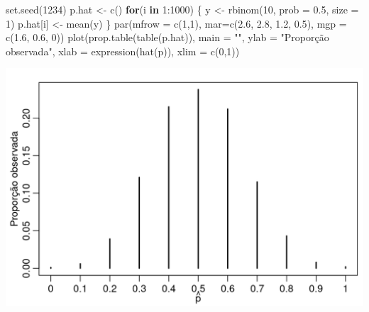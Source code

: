 \documentclass[
  10pt,
  a4paper]{book}
\newenvironment{Shaded}{\begin{snugshade}}{\end{snugshade}}
\newcommand{\AttributeTok}[1]{\textcolor[rgb]{0.77,0.63,0.00}{#1}}
\newcommand{\ControlFlowTok}[1]{\textcolor[rgb]{0.13,0.29,0.53}{\textbf{#1}}}
\newcommand{\DecValTok}[1]{\textcolor[rgb]{0.00,0.00,0.81}{#1}}
\newcommand{\FloatTok}[1]{\textcolor[rgb]{0.00,0.00,0.81}{#1}}
\newcommand{\FunctionTok}[1]{\textcolor[rgb]{0.00,0.00,0.00}{#1}}
\newcommand{\NormalTok}[1]{#1}
\newcommand{\OtherTok}[1]{\textcolor[rgb]{0.56,0.35,0.01}{#1}}
\newcommand{\SpecialCharTok}[1]{\textcolor[rgb]{0.00,0.00,0.00}{#1}}
\newcommand{\StringTok}[1]{\textcolor[rgb]{0.31,0.60,0.02}{#1}}
\begin{document}
\begin{Shaded}
\begin{Highlighting}[]
\FunctionTok{set.seed}\NormalTok{(}\DecValTok{1234}\NormalTok{)}
\NormalTok{p.hat }\OtherTok{\textless{}{-}} \FunctionTok{c}\NormalTok{()}
\ControlFlowTok{for}\NormalTok{(i }\ControlFlowTok{in} \DecValTok{1}\SpecialCharTok{:}\DecValTok{1000}\NormalTok{) \{}
\NormalTok{  y }\OtherTok{\textless{}{-}} \FunctionTok{rbinom}\NormalTok{(}\DecValTok{10}\NormalTok{, }\AttributeTok{prob =} \FloatTok{0.5}\NormalTok{, }\AttributeTok{size =} \DecValTok{1}\NormalTok{)}
\NormalTok{  p.hat[i] }\OtherTok{\textless{}{-}} \FunctionTok{mean}\NormalTok{(y)}
\NormalTok{\}}
\FunctionTok{par}\NormalTok{(}\AttributeTok{mfrow =} \FunctionTok{c}\NormalTok{(}\DecValTok{1}\NormalTok{,}\DecValTok{1}\NormalTok{), }\AttributeTok{mar=}\FunctionTok{c}\NormalTok{(}\FloatTok{2.6}\NormalTok{, }\FloatTok{2.8}\NormalTok{, }\FloatTok{1.2}\NormalTok{, }\FloatTok{0.5}\NormalTok{), }\AttributeTok{mgp =} \FunctionTok{c}\NormalTok{(}\FloatTok{1.6}\NormalTok{, }\FloatTok{0.6}\NormalTok{, }\DecValTok{0}\NormalTok{))}
\FunctionTok{plot}\NormalTok{(}\FunctionTok{prop.table}\NormalTok{(}\FunctionTok{table}\NormalTok{(p.hat)), }\AttributeTok{main =} \StringTok{""}\NormalTok{, }
     \AttributeTok{ylab =} \StringTok{"Proporção observada"}\NormalTok{,}
     \AttributeTok{xlab =} \FunctionTok{expression}\NormalTok{(}\FunctionTok{hat}\NormalTok{(p)), }\AttributeTok{xlim =} \FunctionTok{c}\NormalTok{(}\DecValTok{0}\NormalTok{,}\DecValTok{1}\NormalTok{))}
\end{Highlighting}
\end{Shaded}

\begin{center}\includegraphics{figures/unnamed-chunk-389-1} \end{center}
\end{document}
